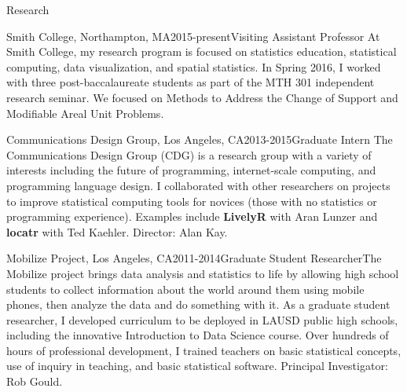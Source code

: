 \documentclass{resume} %
\begin{document}


\begin{rSection}{Research}

\begin{pSubsection}{Smith College, }{Northampton, MA}{2015-present}{Visiting Assistant Professor}
{At Smith College, my research program is focused on statistics education, statistical computing, data visualization, and spatial statistics. In Spring 2016, I worked with three post-baccalaureate students as part of the MTH 301 independent research seminar. We focused on  Methods to Address the Change of Support and Modifiable Areal Unit Problems.}
\end{pSubsection}

\begin{pSubsection}{Communications Design Group, }{Los Angeles, CA}{2013-2015}{Graduate Intern}
{The Communications Design Group (CDG) is a research group with a variety of interests including the future of programming, internet-scale computing, and programming language design. I collaborated with other researchers on projects to improve statistical computing tools for novices (those with no statistics or programming experience). Examples include \textbf{LivelyR} with Aran Lunzer and \textbf{locatr} with Ted Kaehler. Director: Alan Kay.}
\end{pSubsection}


\begin{pSubsection}{Mobilize Project, }{Los Angeles, CA}{2011-2014}{Graduate Student Researcher}{The Mobilize project brings data analysis and statistics to life by allowing high school students to collect information about the world around them using mobile phones, then analyze the data and do something with it. As a graduate student researcher, I developed curriculum to be deployed in LAUSD public high schools, including the innovative Introduction to Data Science course. Over hundreds of hours of professional development, I trained teachers on basic statistical concepts, use of inquiry in teaching, and basic statistical software. Principal Investigator: Rob Gould.}
\end{pSubsection}



\end{rSection}
\end{document}
